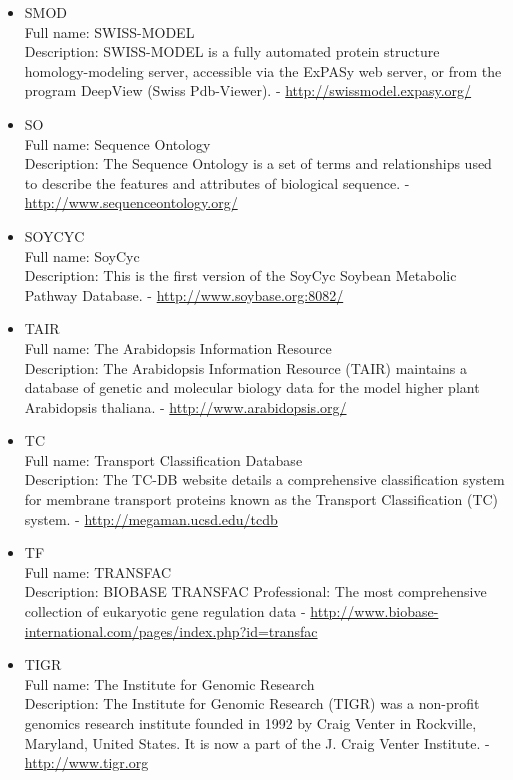 \begin{itemize}
\item{SMOD}\\ Full name: SWISS-MODEL\\ Description: SWISS-MODEL is a fully automated protein structure homology-modeling server, accessible via the ExPASy web server, or from the program DeepView (Swiss Pdb-Viewer). - 
\url{http://swissmodel.expasy.org/}

\item{SO}\\ Full name: Sequence Ontology\\ Description: The Sequence Ontology is a set of terms and relationships used to describe the features and attributes of biological sequence. - 
\url{http://www.sequenceontology.org/}

\item{SOYCYC}\\ Full name: SoyCyc\\ Description: This is the first version of the SoyCyc Soybean Metabolic Pathway Database. - 
\url{http://www.soybase.org:8082/}

\item{TAIR}\\ Full name: The Arabidopsis Information Resource\\ Description: The Arabidopsis Information Resource (TAIR) maintains a database of genetic and molecular biology data for the model higher plant Arabidopsis thaliana. - 
\url{http://www.arabidopsis.org/}

\item{TC}\\ Full name: Transport Classification Database\\ Description: The TC-DB website details a comprehensive classification system for membrane transport proteins known as the Transport Classification (TC) system. - 
\url{http://megaman.ucsd.edu/tcdb}

\item{TF}\\ Full name: TRANSFAC\\ Description: BIOBASE TRANSFAC Professional: The most comprehensive collection of eukaryotic gene regulation data - 
\url{http://www.biobase-international.com/pages/index.php?id=transfac}

\item{TIGR}\\ Full name: The Institute for Genomic Research\\ Description: The Institute for Genomic Research (TIGR) was a non-profit genomics research institute founded in 1992 by Craig Venter in Rockville, Maryland, United States. It is now a part of the J. Craig Venter Institute. - 
\url{http://www.tigr.org}


\end{itemize}
